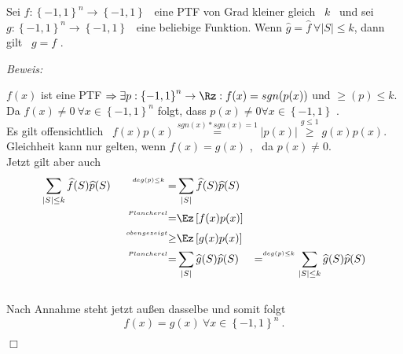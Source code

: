 \documentclass{article}
\newenvironment{proof}{
	\textit{Beweis: \\}
}{
	\begin{flushright}
		$\Box$ 
	\end{flushright}
}
\begin{document}
%	 
	\begin{satz} 
		Sei  $ f:{\left\lbrace -1, 1 \right\rbrace}^n \to \left\lbrace -1,1 \right\rbrace $ \ eine PTF von Grad kleiner gleich \ $k$ \ und sei \ $ g:\left\lbrace-1,1 \right\rbrace^n \to \left\lbrace -1,1 \right\rbrace $ \ eine beliebige Funktion.
	Wenn $ \widehat{g}=\widehat{f} \ \forall \left| S \right| \leq k$, dann gilt \ $g=f$ .

	
	\begin{proof}
		$ f(x) $ ist eine PTF $  \Rightarrow \exists p:{\left\lbrace -1,1 \right\rbrace}^n \to \Rz : f(x)= sgn(p(x) ) $ und  
		 $ \geq (p) \leq k$. \\
		 Da $f(x) \neq 0 \ \forall x \in {\left\lbrace -1,1 \right\rbrace}^n $  folgt,
		 dass $ p(x) \neq 0 \forall x \in \left\lbrace -1,1 \right\rbrace$ . \\
		  Es gilt offensichtlich \ $f(x) p(x) \overset{sgn(x)*sgn(x)=1}{=} \left| p(x) \right| \overset{g\leq 1}{\geq } g(x) p(x)$. \\
		  Gleichheit kann nur gelten, wenn $f(x)=g(x)$ , \ da $p(x) \neq 0 $.\\
		Jetzt gilt aber auch \\
		\begin{eqnarray*}
 			\sum_{ \left| S \right| \leq k} \widehat{f} (S) \widehat{p} (S) \qquad ^{\overset{deg(p)\leq k}{}}=& \sum_{\left| S \right| } \widehat{f} (S) \widehat{p} (S) & \\ ^{\overset{Plancherel}{} }{=}&	\Ez\left[f(x)p(x)\right] & \\
 			^{\overset{oben gezeigt}{} }{\geq}& \Ez \left[g(x)p(x) \right] & \\
 			^{\overset{Plancherel}{} }{=}& \sum_{\left| S \right| } \widehat{g}(S) \widehat{p}(S) 	&=  ^{\overset{deg(p)\leq k}{}} \sum_{\left| S \right| \leq k} \widehat{g}(S) \widehat{p}(S) 
		\end{eqnarray*} \\
		Nach Annahme steht jetzt au{\ss}en dasselbe und somit folgt
		\[
			f(x)=g(x) \  \forall x \in \left\lbrace -1,1 \right\rbrace ^n \ .
		\]
	\end{proof}
		 \end{satz}
\end{document}
